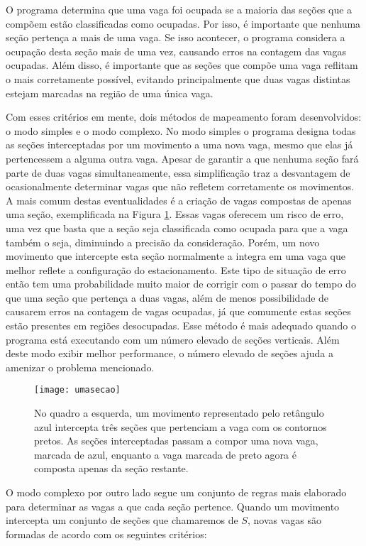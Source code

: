 O programa determina que uma vaga foi ocupada se a maioria das seções que a compõem estão classificadas como ocupadas. Por isso, é importante que nenhuma seção pertença a mais de uma vaga. Se isso acontecer, o programa considera a ocupação desta seção mais de uma vez, causando erros na contagem das vagas ocupadas. Além disso, é importante que as seções que compõe uma vaga reflitam o mais corretamente possível, evitando principalmente que duas vagas distintas estejam marcadas na região de uma única vaga. 

Com esses critérios em mente, dois métodos de mapeamento foram desenvolvidos: o modo simples e o modo complexo. No modo simples o programa designa todas as seções interceptadas por um movimento a uma nova vaga, mesmo que elas já pertencessem a alguma outra vaga. Apesar de garantir a que nenhuma seção fará parte de duas vagas simultaneamente, essa simplificação traz a desvantagem de ocasionalmente determinar vagas que não refletem corretamente os movimentos. A mais comum destas eventualidades é a criação de vagas compostas de apenas uma seção, exemplificada na Figura \ref{fig:umasecao}. Essas vagas oferecem um risco de erro, uma vez que basta que a seção seja classificada como ocupada para que a vaga também o seja, diminuindo a precisão da consideração. Porém, um novo movimento que intercepte esta seção normalmente a integra em uma vaga que melhor reflete a configuração do estacionamento. Este tipo de situação de erro então tem uma probabilidade muito maior de corrigir com o passar do tempo do que uma seção que pertença a duas vagas, além de menos possibilidade de causarem erros na contagem de vagas ocupadas, já que comumente estas seções estão presentes em regiões desocupadas. Esse método é mais adequado quando o programa está executando com um número elevado de seções verticais. Além deste modo exibir melhor performance, o número elevado de seções ajuda a amenizar o problema mencionado.


\begin{figure}%
\centering
\texttt{[image: umasecao]}%
\caption{No quadro a esquerda, um movimento representado pelo retângulo azul intercepta três seções que pertenciam a vaga com os contornos pretos. As seções interceptadas passam a compor uma nova vaga, marcada de azul, enquanto a vaga marcada de preto agora é composta apenas da seção restante.}%
\label{fig:umasecao}%
\centering
\end{figure}

O modo complexo por outro lado segue um conjunto de regras mais elaborado para determinar as vagas a que cada seção pertence. Quando um movimento intercepta um conjunto de seções que chamaremos de $S$, novas vagas são formadas de acordo com os seguintes critérios:

